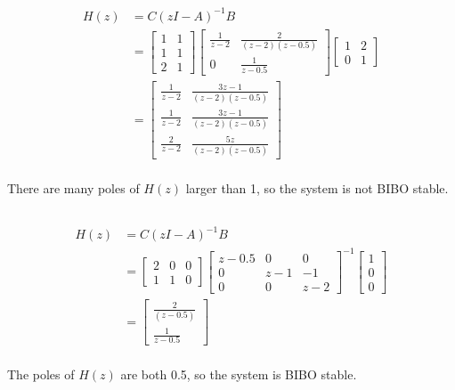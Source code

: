 \documentclass{article}
\begin{document}
\begin{align*}
    H(z)&=C(zI-A)^{-1}B\\
    &=
    \begin{bmatrix}
        1&1\\1&1\\2&1
    \end{bmatrix}
    \begin{bmatrix}
        \frac{1}{z-2}&\frac{2}{(z-2)(z-0.5)}\\
        0&\frac{1}{z-0.5}
    \end{bmatrix}
    \begin{bmatrix}
        1&2\\0&1
    \end{bmatrix}
    \\
    &=
    \begin{bmatrix}
        \frac{1}{z-2}&\frac{3z-1}{(z-2)(z-0.5)}\\
        \frac{1}{z-2}&\frac{3z-1}{(z-2)(z-0.5)}\\
        \frac{2}{z-2}&\frac{5z}{(z-2)(z-0.5)}
    \end{bmatrix}
\end{align*}
\\
There are many poles of $H(z)$ larger than 1, so the system is not BIBO stable.
\subsection{}

\begin{align*}
    H(z)&=C(zI-A)^{-1}B\\
    &=
    \begin{bmatrix}
        2&0&0\\1&1&0
    \end{bmatrix}
    \begin{bmatrix}
        z-0.5&0&0\\0&z-1&-1\\0&0&z-2
    \end{bmatrix}^{-1}
    \begin{bmatrix}
        1\\0\\0
    \end{bmatrix}
    \\
    &=
    \begin{bmatrix}
        \frac{2}{(z-0.5)}\\\frac{1}{z-0.5}
    \end{bmatrix}
\end{align*}
\\
The poles of $H(z)$ are both 0.5, so the system is BIBO stable.
\end{document}
